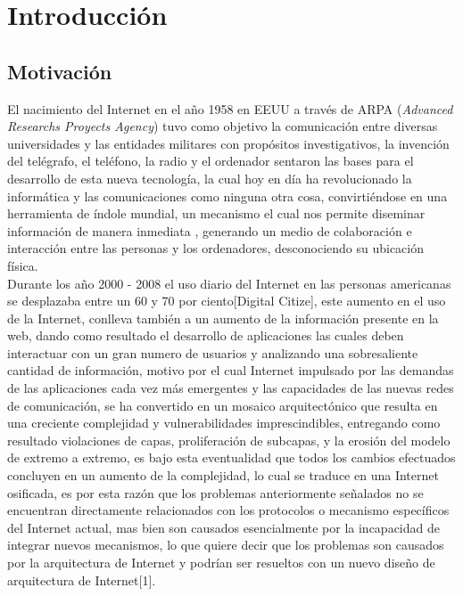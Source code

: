 \documentclass[12pt]{ociamthesis}  %
\begin{document}
\begin{romanpages}          %
\tableofcontents            %
\listoffigures              %
\end{romanpages}            %

\chapter{Introducción}
\section{Motivación}

El nacimiento del Internet en el año 1958 en EEUU a través de ARPA (\textit{Advanced Researchs Proyects Agency}) tuvo como objetivo la comunicación entre diversas universidades y las entidades militares con propósitos investigativos, la invención del telégrafo, el teléfono, la radio y el ordenador sentaron las bases para el desarrollo de esta nueva tecnología, la cual hoy en día ha revolucionado la informática y las comunicaciones como ninguna otra cosa, convirtiéndose en una herramienta de índole mundial, un mecanismo el cual nos permite diseminar información de manera inmediata , generando un medio de colaboración e interacción entre las personas y los ordenadores, desconociendo su ubicación física.\\

Durante los año 2000 - 2008 el uso diario del Internet en las personas americanas se desplazaba entre un 60 y 70 por ciento[Digital Citize], este aumento en el uso de la Internet, conlleva también a un aumento de la información presente en la web, dando como resultado el desarrollo de aplicaciones las cuales deben interactuar con un gran numero de usuarios y analizando una sobresaliente cantidad de información, motivo por el cual Internet impulsado por las demandas de las aplicaciones cada vez más emergentes y las capacidades de las nuevas redes de comunicación, se ha convertido en un mosaico arquitectónico que resulta en una creciente complejidad y vulnerabilidades imprescindibles, entregando como resultado violaciones de capas, proliferación de subcapas, y la erosión del modelo de extremo a extremo, es bajo esta eventualidad que todos los cambios efectuados concluyen en un aumento de la complejidad, lo cual se traduce en una Internet osificada, es por esta razón que los problemas anteriormente señalados no se encuentran directamente relacionados con los protocolos o mecanismo específicos del Internet actual, mas bien son causados esencialmente por la incapacidad de integrar nuevos mecanismos, lo que quiere decir que los problemas son causados por la arquitectura de Internet y podrían ser resueltos con un nuevo diseño de arquitectura de Internet[1].\\
\end{document}
